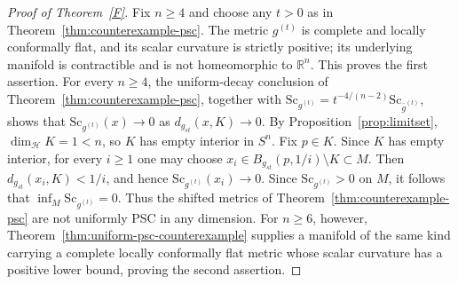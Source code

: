 \documentclass[12pt,oneside,a4paper]{article}
\theoremstyle{mytheorem}
\theoremstyle{remark}
\theoremstyle{definition}
\begin{document}
\begin{proof}[Proof of Theorem~\ref{F}]
Fix $n\geq4$ and choose any $t>0$ as in Theorem~\ref{thm:counterexample-psc}.  The metric
$g^{(t)}$ is complete and locally conformally flat, and its scalar
curvature is strictly positive; its underlying manifold is contractible
and is not homeomorphic to $\mathbb R^n$.  This proves the first
assertion.  For every $n\geq4$, the uniform-decay conclusion of
Theorem~\ref{thm:counterexample-psc}, together with
$\mathrm{Sc}_{g^{(t)}}=
t^{-4/(n-2)}\mathrm{Sc}_{\bar g^{(t)}}$,
shows that $\mathrm{Sc}_{g^{(t)}}(x)\to0$ as
$d_{g_{st}}(x,K)\to0$.  By Proposition~\ref{prop:limitset},
$\dim_{\mathcal{H}}K=1<n$, so $K$ has empty interior in $S^n$.
Fix $p\in K$.  Since $K$ has empty interior, for every $i\geq1$ one may
choose $x_i\in B_{g_{st}}(p,1/i)\setminus K\subset M$.
Then $d_{g_{st}}(x_i,K)<1/i$, and hence
$\mathrm{Sc}_{g^{(t)}}(x_i)\to0$.  Since
$\mathrm{Sc}_{g^{(t)}}>0$ on $M$, it follows that
$\inf_M\mathrm{Sc}_{g^{(t)}}=0$.
Thus the shifted metrics of
Theorem~\ref{thm:counterexample-psc} are not uniformly PSC in any dimension.  For
$n\geq6$, however, Theorem~\ref{thm:uniform-psc-counterexample} supplies a manifold of the
same kind carrying a complete locally conformally flat metric whose
scalar curvature has a positive lower bound, proving the second
assertion. 
\end{proof}








\end{document}
